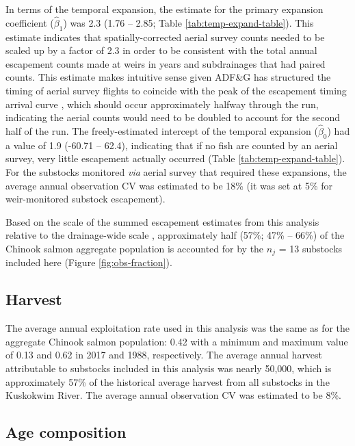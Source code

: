 \documentclass[12pt,]{book}
\theoremstyle{definition}
\theoremstyle{definition}
\theoremstyle{definition}
\theoremstyle{remark}
\begin{document}
In terms of the temporal expansion, the estimate for the primary
expansion coefficient (\(\hat{\beta}_1\)) was 2.3 (1.76 -- 2.85; Table
\ref{tab:temp-expand-table}). This estimate indicates that
spatially-corrected aerial survey counts needed to be scaled up by a
factor of 2.3 in order to be consistent with the total annual escapement
counts made at weirs in years and subdrainages that had paired counts.
This estimate makes intuitive sense given ADF\&G has structured the
timing of aerial survey flights to coincide with the peak of the
escapement timing arrival curve \citep{head-smith-2018}, which should
occur approximately halfway through the run, indicating the aerial
counts would need to be doubled to account for the second half of the
run. The freely-estimated intercept of the temporal expansion
(\(\hat{\beta}_0\)) had a value of 1.9 (-60.71 -- 62.4), indicating that
if no fish are counted by an aerial survey, very little escapement
actually occurred (Table \ref{tab:temp-expand-table}). For the substocks
monitored \emph{via} aerial survey that required these expansions, the
average annual observation CV was estimated to be 18\% (it was set at
5\% for weir-monitored substock escapement).

Based on the scale of the summed escapement estimates from this analysis
relative to the drainage-wide scale \citep[which includes monitored and
unmonitored substocks;][]{liller-etal-2018}, approximately half (57\%;
47\% -- 66\%) of the Chinook salmon aggregate population is accounted
for by the \(n_j\) = 13 substocks included here (Figure
\ref{fig:obs-fraction}).

\subsection{Harvest}\label{harv-data-results}

\noindent
The average annual exploitation rate used in this analysis was the same
as for the aggregate Chinook salmon population: 0.42 with a minimum and
maximum value of 0.13 and 0.62 in 2017 and 1988, respectively. The
average annual harvest attributable to substocks included in this
analysis was nearly 50,000, which is approximately 57\% of the
historical average harvest from all substocks in the Kuskokwim River.
The average annual observation CV was estimated to be 8\%.

\subsection{Age composition}\label{age-data-results}
\end{document}
